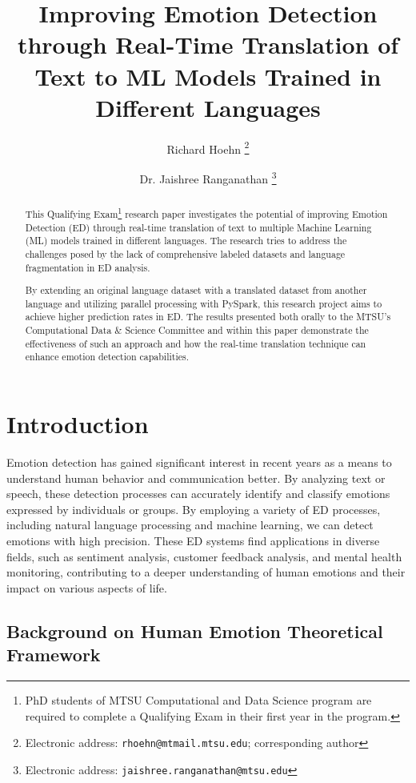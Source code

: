 \documentclass[11pt]{article}
\title{Improving Emotion Detection through Real-Time Translation of Text to ML Models Trained in Different Languages}
\author{Richard Hoehn%
	\thanks{Electronic address: \texttt{rhoehn@mtmail.mtsu.edu}; corresponding author}}
\affil{Middle Tennessee State University}
\author{Dr. Jaishree Ranganathan%
	\thanks{Electronic address: \texttt{jaishree.ranganathan@mtsu.edu}}}
\affil{Middle Tennessee State University}
\begin{document}
\maketitle

\begin{abstract}
This Qualifying Exam\footnote{PhD students of MTSU Computational and Data  Science program are required to complete a Qualifying Exam in their first year in the program.} research paper investigates the potential of improving Emotion Detection (ED) through real-time translation of text to multiple Machine Learning (ML) models trained in different languages. The research tries to address the challenges posed by the lack of comprehensive labeled datasets and language fragmentation in ED analysis.

By extending an original language dataset with a translated dataset from another language and utilizing parallel processing with PySpark, this research project aims to achieve higher prediction rates in ED. The results presented both orally to the MTSU's Computational Data \& Science Committee and within this paper demonstrate the effectiveness of such an approach and how the real-time translation technique can enhance emotion detection capabilities.
\end{abstract}
\clearpage

\tableofcontents
\clearpage

\section{Introduction}

Emotion detection has gained significant interest in recent years as a means to understand human behavior and communication better. By analyzing text or speech, these detection processes can accurately identify and classify emotions expressed by individuals or groups. By employing a variety of ED processes, including natural language processing and machine learning, we can detect emotions with high precision. These ED systems find applications in diverse fields, such as sentiment analysis, customer feedback analysis, and mental health monitoring, contributing to a deeper understanding of human emotions and their impact on various aspects of life.

\subsection{Background on Human Emotion Theoretical Framework}
\end{document}
